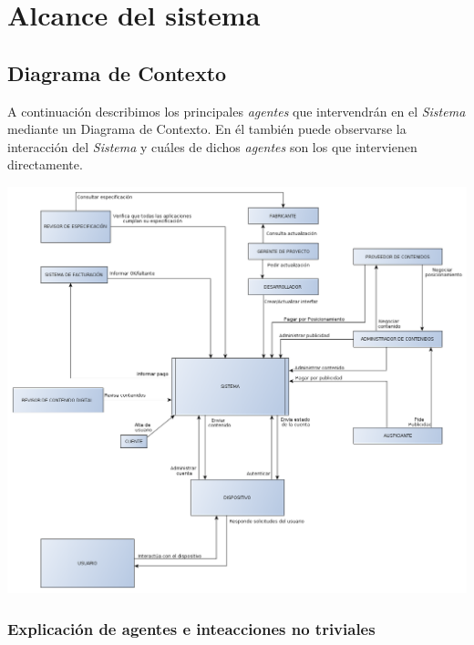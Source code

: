 \documentclass[11pt, a4paper, spanish]{article}
\begin{document}
\section{Alcance del sistema}

\subsection{Diagrama de Contexto}

	A continuaci\'on describimos los principales \emph{agentes} que intervendr\'an en el \emph{Sistema} mediante un Diagrama de Contexto.
	En \'el tambi\'en puede observarse la interacci\'on del \emph{Sistema} y cu\'ales de dichos \emph{agentes} son los que intervienen directamente.

	\begin{center}
		\includegraphics[scale=0.35]{Diagramas/DiagramaContexto.png}
	\end{center}
\subsubsection{Explicaci\'on de agentes e inteacciones no triviales}
\end{document}
